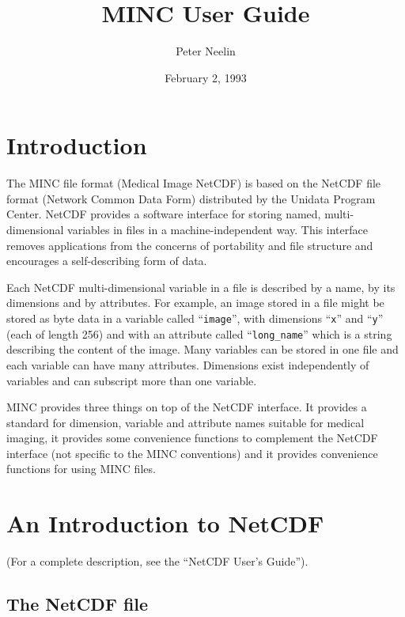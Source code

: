 \title{MINC User Guide}
\author{Peter Neelin}
\date{February 2, 1993}
\textwidth 6.0in
\oddsidemargin 0.125in
\textheight 8.5in
\topmargin -0.75in



\maketitle

\section{Introduction}

The MINC file format (Medical Image NetCDF) is based on the NetCDF
file format (Network Common Data Form) distributed by the Unidata
Program Center. NetCDF provides a software interface for storing
named, multi-dimensional variables in files in a machine-independent
way. This interface removes applications from the concerns of
portability and file structure and encourages a self-describing form
of data.

Each NetCDF multi-dimensional variable in a file is described by a
name, by its dimensions and by attributes. For example, an image
stored in a file might be stored as byte data in a variable called
``\verb+image+'', with dimensions ``\verb+x+'' and ``\verb+y+'' (each
of length 256) and with an attribute called ``\verb+long_name+'' which
is a string describing the content of the image. Many variables can be
stored in one file and each variable can have many attributes.
Dimensions exist independently of variables and can subscript more
than one variable.

MINC provides three things on top of the NetCDF interface. It provides
a standard for dimension, variable and attribute names suitable for
medical imaging, it provides some convenience functions to complement
the NetCDF interface (not specific to the MINC conventions) and it
provides convenience functions for using MINC files.

\section{An Introduction to NetCDF}

(For a complete description, see the ``NetCDF User's Guide'').

\subsection{The NetCDF file}

